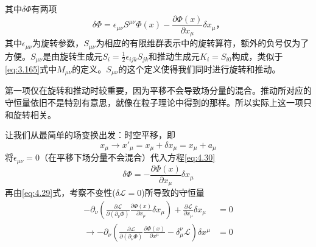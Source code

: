 其中$\delta\Phi$有两项
\begin{equation}
\delta\Phi = \epsilon_{\mu\nu}S^{\mu\nu}\Phi(x)-\frac{\partial\Phi(x)}{\partial x_\mu}\delta x_\mu \text{，}
\label{eq:4.30}
\end{equation}
其中$\epsilon_{\mu\nu}$为旋转参数，$S_{\mu\nu}$为相应的有限维群表示中的旋转算符，额外的负号仅为了方便。$S_{\mu\nu}$是由旋转生成元$S_{i}=\frac{1}{2}\epsilon_{ijk}S_{jk}$和推动生成元$K_i=S_{i0}$构成，类似于\ref{eq:3.165}式中$M_{\mu\nu}$的定义。$S_{\mu\nu}$的这个定义使得我们同时进行旋转和推动。

第一项仅在旋转和推动时较重要，因为平移不会导致场分量的混合。推动所对应的守恒量依旧不是特别有意思，就像在粒子理论中得到的那样。所以实际上这一项只和旋转相关。

让我们从最简单的场变换出发：时空平移，即
\begin{equation}
x_\mu \rightarrow x'_\mu = x_\mu + \delta x_\mu = x_\mu + a_\mu
\label{eq:4.31}
\end{equation}
将$\epsilon_{\mu\nu}=0$（在平移下场分量不会混合）代入方程\ref{eq:4.30}
\[
\delta\Phi = -\frac{\partial\Phi(x)}{\partial x_\mu}\delta x_\mu
\]
再由\ref{eq:4.29}式，考察不变性($\delta{\mathscr L}=0$)所导致的守恒量
\begin{eqnarray}
-\partial_\nu\left(\frac{\partial\mathscr L}{\partial(\partial_\nu \Phi)}\frac{\partial\Phi(x)}{\partial x_\mu}\delta x_\mu\right) + \frac{\partial\mathscr L}{\partial x_\mu}\delta x_\mu &= 0 \\
\rightarrow -\partial_\nu\left(\frac{\partial\mathscr L}{\partial(\partial_\nu \Phi)}\frac{\partial\Phi(x)}{\partial x^\mu} - \delta_\mu^\nu{\mathscr L}\right) \delta x^\mu &= 0 \label{eq:4.33}
\end{eqnarray}

